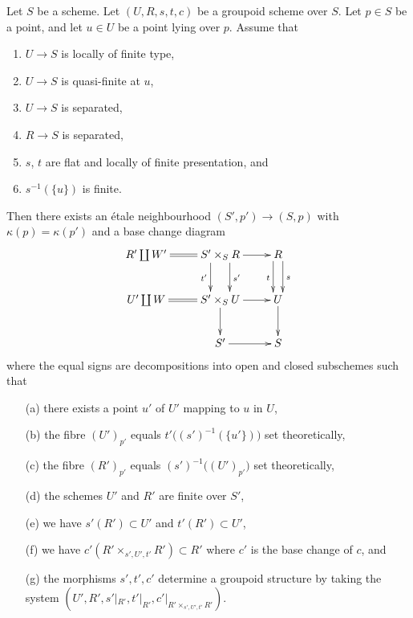 \begin{lemma}
\label{lemma-quasi-finite-over-base}
Let $S$ be a scheme.
Let $(U, R, s, t, c)$ be a groupoid scheme over $S$.
Let $p \in S$ be a point, and let $u \in U$ be a point lying over $p$.
Assume that
\begin{enumerate}
\item $U \to S$ is locally of finite type,
\item $U \to S$ is quasi-finite at $u$,
\item $U \to S$ is separated,
\item $R \to S$ is separated,
\item $s$, $t$ are flat and locally of finite presentation, and
\item $s^{-1}(\{u\})$ is finite.
\end{enumerate}
Then there exists an \'etale neighbourhood $(S', p') \to (S, p)$ with
$\kappa(p) = \kappa(p')$ and a base change diagram
$$
\xymatrix{
R' \coprod W'
\ar@{=}[r] &
S' \times_S R
\ar[r] \ar@<2ex>[d]^{s'} \ar@<-2ex>[d]_{t'} &
R \ar@<1ex>[d]^s \ar@<-1ex>[d]_t \\
U' \coprod W
\ar@{=}[r] &
S' \times_S U
\ar[r] \ar[d] &
U \ar[d] \\
 &
S' \ar[r] &
S
}
$$
where the equal signs are decompositions into open and closed
subschemes such that
\begin{enumerate}
\item[(a)] there exists a point $u'$ of $U'$ mapping to $u$ in $U$,
\item[(b)] the fibre $(U')_{p'}$ equals $t'\big((s')^{-1}(\{u'\})\big)$
set theoretically,
\item[(c)] the fibre $(R')_{p'}$ equals $(s')^{-1}\big((U')_{p'}\big)$
set theoretically,
\item[(d)] the schemes $U'$ and $R'$ are finite over $S'$,
\item[(e)] we have $s'(R') \subset U'$ and $t'(R') \subset U'$,
\item[(f)] we have
$c'(R' \times_{s', U', t'} R') \subset R'$
where $c'$ is the base change of $c$, and
\item[(g)] the morphisms $s', t', c'$ determine a groupoid structure
by taking the system
$(U', R', s'|_{R'}, t'|_{R'}, c'|_{R' \times_{s', U', t'} R'})$.
\end{enumerate}
\end{lemma}

